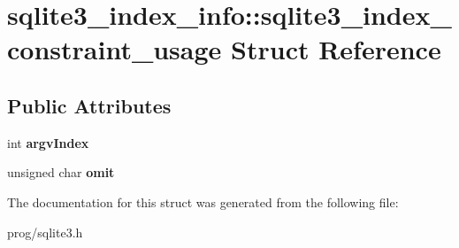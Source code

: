 \hypertarget{structsqlite3__index__info_1_1sqlite3__index__constraint__usage}{}\section{sqlite3\+\_\+index\+\_\+info\+:\+:sqlite3\+\_\+index\+\_\+constraint\+\_\+usage Struct Reference}
\label{structsqlite3__index__info_1_1sqlite3__index__constraint__usage}
\subsection*{Public Attributes}
\begin{DoxyCompactItemize}
\item 
\mbox{\label{structsqlite3__index__info_1_1sqlite3__index__constraint__usage_a2cbf680033c2937b3de226e091743a94}} 
int {\bfseries argv\+Index}
\item 
\mbox{\label{structsqlite3__index__info_1_1sqlite3__index__constraint__usage_ad07fa17d30e4fb3abe23ceaf84edf0ef}} 
unsigned char {\bfseries omit}
\end{DoxyCompactItemize}


The documentation for this struct was generated from the following file\+:\begin{DoxyCompactItemize}
\item 
prog/sqlite3.\+h\end{DoxyCompactItemize}
